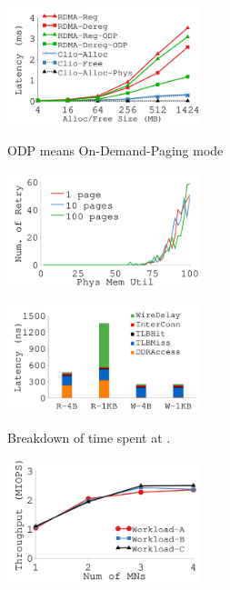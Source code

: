 {
\begin{figure}[th]
\begin{center}
\centerline{\includegraphics[width=0.5\textwidth]{clio/Figures/g_plot_alloc_free.pdf}}
{
ODP means On-Demand-Paging mode
}
\end{center}
\end{figure}
}
{
\begin{figure}[h]
\begin{center}
\centerline{\includegraphics[width=0.5\textwidth]{clio/Figures/g_plot_alloc_conflict.pdf}}
{
}
\end{center}
\end{figure}
}
{
\begin{figure}[h]
\begin{center}
\centerline{\includegraphics[width=0.5\textwidth]{clio/Figures/g_plot_latency_breakdown.pdf}}
{
Breakdown of time spent at \sysboard.
}
\end{center}
\end{figure}
}
{
\begin{figure}[h]
\begin{center}
\centerline{\includegraphics[width=0.5\textwidth]{clio/Figures/g_plot_ycsb_mn.pdf}}
{
}
\end{center}
\end{figure}
}

